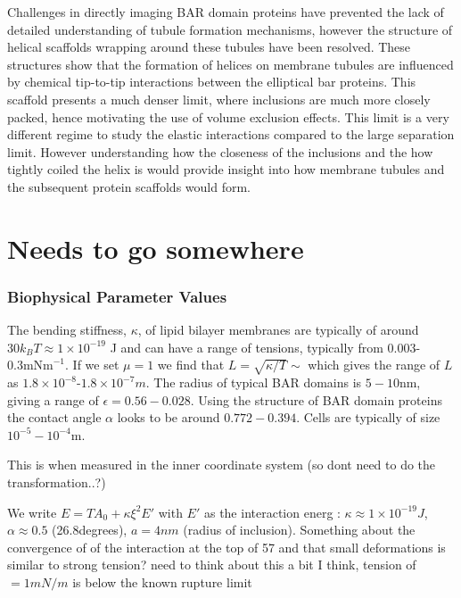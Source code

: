{Challenges in directly imaging BAR domain proteins have prevented the lack of detailed understanding of tubule formation mechanisms, however the structure of helical scaffolds wrapping around these tubules have been resolved.\cite{mim_structural_2012, frost_structural_2008} These structures show that the formation of helices on membrane tubules are influenced by chemical tip-to-tip interactions between the elliptical bar proteins. This scaffold presents a much denser limit, where inclusions are much more closely packed, hence motivating the use of volume exclusion effects\cite{noguchi_binding_2022}. This limit is a very different regime to study the elastic interactions compared to the large separation limit. However understanding how the closeness of the inclusions and the how tightly coiled the helix is would provide insight into how membrane tubules and the subsequent protein scaffolds would form.

\section{Needs to go somewhere}

\subsubsection{Biophysical Parameter Values}

The bending stiffness, $\kappa$, of lipid bilayer membranes are typically of around $30 k_B T \approx 1 \times 10^{-19} $ J \cite{weikl_interaction_1998} and can have a range of tensions, typically from $0.003$-$0.3\text{mNm}^{-1}$. \cite{shi_membrane_2015} If we set $\mu=1$ we find that $L = \sqrt{\kappa/T} \sim$ which gives the range of $L$ as $1.8\times10^{-8}$-$1.8\times10^{-7}m$. The radius of typical BAR domains is $5-10$nm, giving a range of $\epsilon = 0.56-0.028$. Using the structure of BAR domain proteins the contact angle $\alpha$ looks to be around $0.772-0.394$. Cells are typically of size $10^{-5}-10^{-4}$m.

This is when measured in the inner coordinate system (so dont need to do the transformation..?)

We write $E= TA_0 + \kappa\xi^2 E'$ with $E'$ as the interaction energ
\cite{weikl_interaction_1998}: $\kappa\approx1\times10^{-19} J$, $\alpha\approx0.5$ (26.8degrees), $a=4nm$ (radius of inclusion). Something about the convergence of of the interaction at the top of 57 and that small deformations is similar to  strong tension? need to think about this a bit I think, tension of $=1mN/m$ is below the known rupture limit

}
